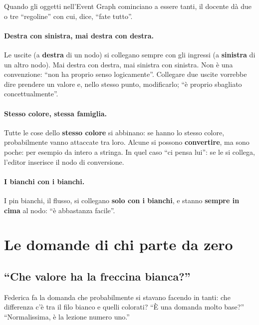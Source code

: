 Quando gli oggetti nell'Event Graph cominciano a essere tanti, il docente dà
due o tre ``regoline'' con cui, dice, ``fate tutto''.

\paragraph{Destra con sinistra, mai destra con destra.} Le uscite (a
\textbf{destra} di un nodo) si collegano sempre con gli ingressi (a
\textbf{sinistra} di un altro nodo). Mai destra con destra, mai sinistra con
sinistra. Non è una convenzione: ``non ha proprio senso logicamente''.
Collegare due uscite vorrebbe dire prendere un valore e, nello stesso punto,
modificarlo; ``è proprio sbagliato concettualmente''.

\paragraph{Stesso colore, stessa famiglia.} Tutte le cose dello
\textbf{stesso colore} si abbinano: se hanno lo stesso colore, probabilmente
vanno attaccate tra loro. Alcune si possono \textbf{convertire}, ma sono
poche: per esempio da intero a stringa. In quel caso ``ci pensa lui'': se le
si collega, l'editor inserisce il nodo di conversione.

\paragraph{I bianchi con i bianchi.} I pin bianchi, il flusso, si collegano
\textbf{solo con i bianchi}, e stanno \textbf{sempre in cima} al nodo: ``è
abbastanza facile''.

\section{Le domande di chi parte da zero}
\label{gd7:sec:federica}

\subsection{``Che valore ha la freccina bianca?''}

Federica fa la domanda che probabilmente si stavano facendo in tanti: che
differenza c'è tra il filo bianco e quelli colorati? ``È una domanda molto
base?'' ``Normalissima, è la lezione numero uno.''

